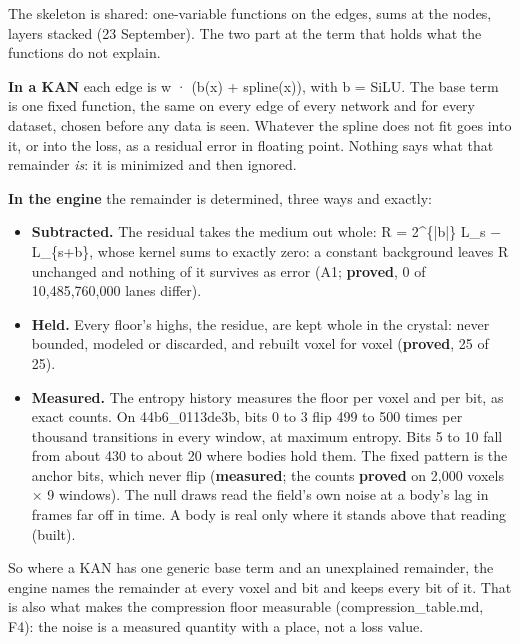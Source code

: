 The skeleton is shared: one-variable functions on the edges, sums at the nodes, layers stacked (23 September). The two part at the term that holds what the functions do not explain.

\textbf{In a KAN} each edge is w · (b(x) + spline(x)), with b = SiLU. The base term is one fixed function, the same on every edge of every network and for every dataset, chosen before any data is seen. Whatever the spline does not fit goes into it, or into the loss, as a residual error in floating point. Nothing says what that remainder \emph{is}: it is minimized and then ignored.

\textbf{In the engine} the remainder is determined, three ways and exactly:

\begin{itemize}
\item \textbf{Subtracted.} The residual takes the medium out whole: R = 2\textasciicircum{}\{|b|\} L\_\allowbreak{}s − L\_\allowbreak{}\{s+b\}, whose kernel sums to exactly zero: a constant background leaves R unchanged and nothing of it survives as error (A1; \textbf{proved}, 0 of 10,485,760,000 lanes differ).
\item \textbf{Held.} Every floor's highs, the residue, are kept whole in the crystal: never bounded, modeled or discarded, and rebuilt voxel for voxel (\textbf{proved}, 25 of 25).
\item \textbf{Measured.} The entropy history measures the floor per voxel and per bit, as exact counts. On 44b6\_\allowbreak{}0113de3b, bits 0 to 3 flip 499 to 500 times per thousand transitions in every window, at maximum entropy. Bits 5 to 10 fall from about 430 to about 20 where bodies hold them. The fixed pattern is the anchor bits, which never flip (\textbf{measured}; the counts \textbf{proved} on 2,000 voxels × 9 windows). The null draws read the field's own noise at a body's lag in frames far off in time. A body is real only where it stands above that reading (built).
\end{itemize}

So where a KAN has one generic base term and an unexplained remainder, the engine names the remainder at every voxel and bit and keeps every bit of it. That is also what makes the compression floor measurable (compression\_\allowbreak{}table.md, F4): the noise is a measured quantity with a place, not a loss value.

